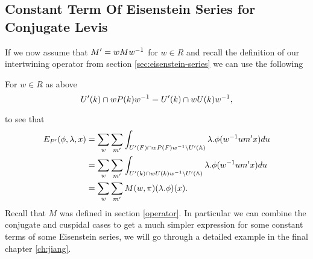     \subsection{Constant Term Of Eisenstein Series for Conjugate Levis}\label{constant_conjugate_levi}
    If we now assume that \(M' = wMw^{-1}\) for \(w\in R\) and recall the definition of our intertwining operator from section \ref{sec:eisenstein-series} we can use the following 
    \begin{Lemma} For \(w\in R\) as above
        \[U'(k) \cap wP(k) w^{-1} = U'(k) \cap wU(k)w^{-1},\]
    \end{Lemma}
    to see that 
    \begin{equation*}
        \begin{aligned}
             E_{P'}( \phi, \lambda, x) &= \sum_{ w} \sum_{m'} \int_{U'(F)\cap wP(F)w\inv \setminus U'(\A)} \lambda.\phi( w\inv um' x)  du \\
             &=  \sum_{ w} \sum_{m'} \int_{U'(k) \cap wU(k)w\inv \setminus U'(\A)} \lambda.\phi( w\inv um' x)  du \\
             &= \sum_{ w} \sum_{m'} M(w, \pi)(\lambda.\phi)(x).
        \end{aligned}
    \end{equation*}
    Recall that \(M\) was defined in section \ref{operator}. In particular we can combine the conjugate and cuspidal cases to get a much simpler expression for some constant terms of some Eisenstein series, we will go through a detailed example in the final chapter \ref{ch:jiang}.
    


    